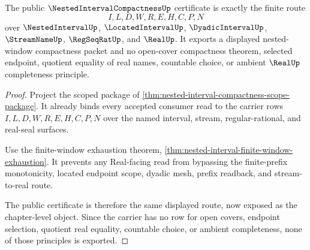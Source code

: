 \begin{theorem}
\label{thm:nested-interval-compactness-public-certificate}
The public $\NestedIntervalCompactnessUp$ certificate is exactly the finite route
$$
I,L,D,W,R,E,H,C,P,N
$$
over $\NestedIntervalUp$, $\LocatedIntervalUp$, $\DyadicIntervalUp$, $\StreamNameUp$, $\RegSeqRatUp$, and $\RealUp$. It exports a displayed nested-window compactness packet and no open-cover compactness theorem, selected endpoint, quotient equality of real names, countable choice, or ambient $\RealUp$ completeness principle.
\end{theorem}
\begin{proof}
Project the scoped package of \autoref{thm:nested-interval-compactness-scope-package}. It already binds every accepted consumer read to the carrier rows $I,L,D,W,R,E,H,C,P,N$ over the named interval, stream, regular-rational, and real-seal surfaces.

Use the finite-window exhaustion theorem, \autoref{thm:nested-interval-finite-window-exhaustion}. It prevents any Real-facing read from bypassing the finite-prefix monotonicity, located endpoint scope, dyadic mesh, prefix readback, and stream-to-real route.

The public certificate is therefore the same displayed route, now exposed as the chapter-level object. Since the carrier has no row for open covers, endpoint selection, quotient real equality, countable choice, or ambient completeness, none of those principles is exported.
\end{proof}


